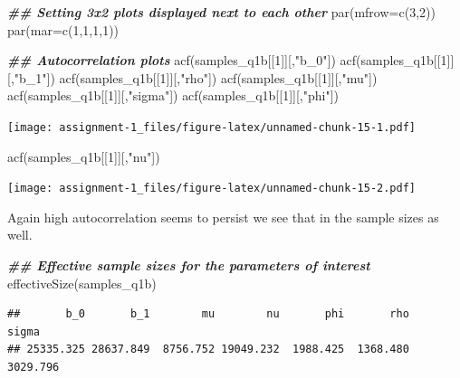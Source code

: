 \documentclass[
]{article}
\newenvironment{Shaded}{\begin{snugshade}}{\end{snugshade}}
\newcommand{\AttributeTok}[1]{\textcolor[rgb]{0.77,0.63,0.00}{#1}}
\newcommand{\DecValTok}[1]{\textcolor[rgb]{0.00,0.00,0.81}{#1}}
\newcommand{\DocumentationTok}[1]{\textcolor[rgb]{0.56,0.35,0.01}{\textbf{\textit{#1}}}}
\newcommand{\FunctionTok}[1]{\textcolor[rgb]{0.00,0.00,0.00}{#1}}
\newcommand{\NormalTok}[1]{#1}
\newcommand{\StringTok}[1]{\textcolor[rgb]{0.31,0.60,0.02}{#1}}
\begin{document}
\begin{Shaded}
\begin{Highlighting}[]
\DocumentationTok{\#\# Setting 3x2 plots displayed next to each other}
\FunctionTok{par}\NormalTok{(}\AttributeTok{mfrow=}\FunctionTok{c}\NormalTok{(}\DecValTok{3}\NormalTok{,}\DecValTok{2}\NormalTok{))}
\FunctionTok{par}\NormalTok{(}\AttributeTok{mar=}\FunctionTok{c}\NormalTok{(}\DecValTok{1}\NormalTok{,}\DecValTok{1}\NormalTok{,}\DecValTok{1}\NormalTok{,}\DecValTok{1}\NormalTok{))}

\DocumentationTok{\#\# Autocorrelation plots}
\FunctionTok{acf}\NormalTok{(samples\_q1b[[}\DecValTok{1}\NormalTok{]][,}\StringTok{"b\_0"}\NormalTok{])}
\FunctionTok{acf}\NormalTok{(samples\_q1b[[}\DecValTok{1}\NormalTok{]][,}\StringTok{"b\_1"}\NormalTok{])}
\FunctionTok{acf}\NormalTok{(samples\_q1b[[}\DecValTok{1}\NormalTok{]][,}\StringTok{"rho"}\NormalTok{])}
\FunctionTok{acf}\NormalTok{(samples\_q1b[[}\DecValTok{1}\NormalTok{]][,}\StringTok{"mu"}\NormalTok{])}
\FunctionTok{acf}\NormalTok{(samples\_q1b[[}\DecValTok{1}\NormalTok{]][,}\StringTok{"sigma"}\NormalTok{])}
\FunctionTok{acf}\NormalTok{(samples\_q1b[[}\DecValTok{1}\NormalTok{]][,}\StringTok{"phi"}\NormalTok{])}
\end{Highlighting}
\end{Shaded}

\texttt{[image: assignment-1\_files/figure-latex/unnamed-chunk-15-1.pdf]}

\begin{Shaded}
\begin{Highlighting}[]
\FunctionTok{acf}\NormalTok{(samples\_q1b[[}\DecValTok{1}\NormalTok{]][,}\StringTok{"nu"}\NormalTok{])}
\end{Highlighting}
\end{Shaded}

\texttt{[image: assignment-1\_files/figure-latex/unnamed-chunk-15-2.pdf]}

Again high autocorrelation seems to persist we see that in the sample
sizes as well.

\begin{Shaded}
\begin{Highlighting}[]
\DocumentationTok{\#\# Effective sample sizes for the parameters of interest }
\FunctionTok{effectiveSize}\NormalTok{(samples\_q1b)}
\end{Highlighting}
\end{Shaded}

\begin{verbatim}
##       b_0       b_1        mu        nu       phi       rho     sigma 
## 25335.325 28637.849  8756.752 19049.232  1988.425  1368.480  3029.796
\end{verbatim}
\end{document}

